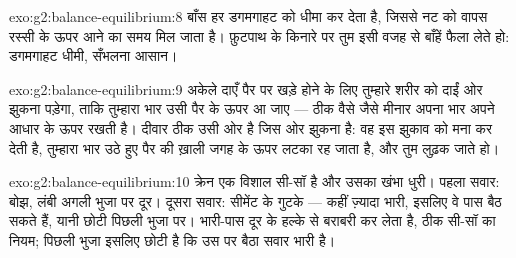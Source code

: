 \begin{solution}{exo:g2:balance-equilibrium:8}
बाँस हर डगमगाहट को धीमा कर देता है, जिससे नट को वापस रस्सी के ऊपर आने
का समय मिल जाता है। फ़ुटपाथ के किनारे पर तुम इसी वजह से बाँहें फैला
लेते हो: डगमगाहट धीमी, सँभलना आसान।
\end{solution}

\begin{solution}{exo:g2:balance-equilibrium:9}
अकेले दाएँ पैर पर खड़े होने के लिए तुम्हारे शरीर को दाईं ओर झुकना
पड़ेगा, ताकि तुम्हारा भार उसी पैर के ऊपर आ जाए --- ठीक वैसे जैसे
मीनार अपना भार अपने आधार के ऊपर रखती है। दीवार ठीक उसी ओर है जिस ओर
झुकना है: वह इस झुकाव को मना कर देती है, तुम्हारा भार उठे हुए पैर की
ख़ाली जगह के ऊपर लटका रह जाता है, और तुम लुढ़क जाते हो।
\end{solution}

\begin{solution}{exo:g2:balance-equilibrium:10}
क्रेन एक विशाल सी-सॉ है और उसका खंभा धुरी। पहला सवार: बोझ, लंबी अगली
भुजा पर दूर। दूसरा सवार: सीमेंट के गुटके --- कहीं ज़्यादा भारी,
इसलिए वे पास बैठ सकते हैं, यानी छोटी पिछली भुजा पर। भारी-पास दूर के
हल्के से बराबरी कर लेता है, ठीक सी-सॉ का नियम; पिछली भुजा इसलिए छोटी
है कि उस पर बैठा सवार भारी है।
\end{solution}
